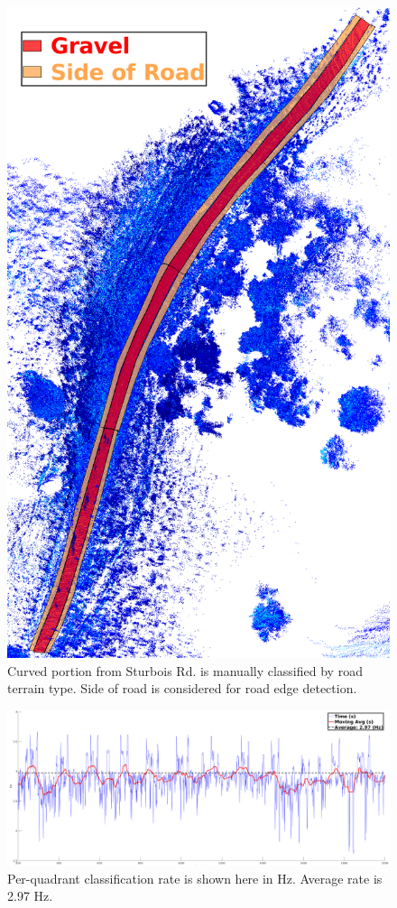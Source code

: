 \documentclass[numbered,pdftex]{ohio-etd}
\begin{document}
{		\begin{figure}[H]
			\centering
			\includegraphics[width=0.7\linewidth]{Defense_Images/sturbois_curve_1_manual_classified.png}
			\caption[Manually Classified Areas - Sturbois Curved Section]{Curved portion from Sturbois Rd. is manually classified by road terrain type. Side of road is considered for road edge detection.}
			\label{fig:Manually_Classified_Areas}
		\end{figure}
	
		\begin{figure}[H]
			\centering
			\includegraphics[width=1\linewidth]{Defense_Images/Time_Hz_Rate.png}
			\caption[Quadrant Classification Rate]{Per-quadrant classification rate is shown here in Hz. Average rate is 2.97 Hz.}
			\label{fig:Time_Hz_Rate}
		\end{figure}
	
}
\end{document}
